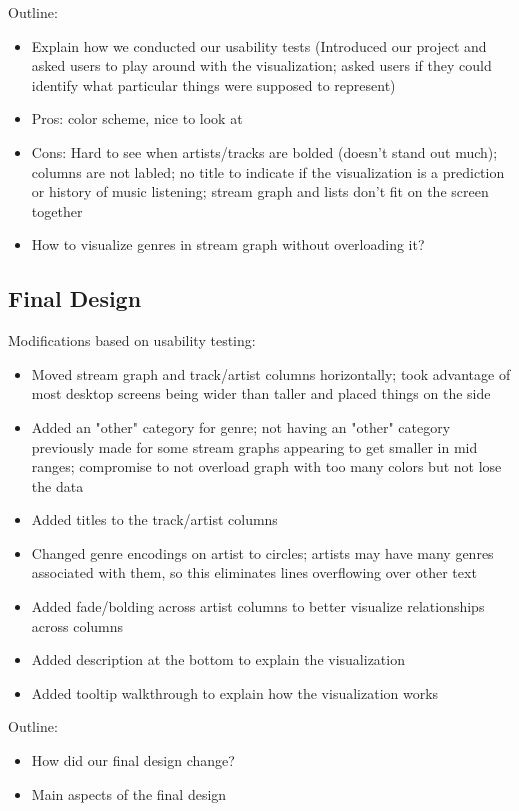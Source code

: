 \documentclass[journal]{vgtc}                %
\begin{document}
Outline:
\begin{itemize}
  \item Explain how we conducted our usability tests (Introduced our project and asked users to play around with the visualization; asked users if they could identify what particular things were supposed to represent)
  \item Pros: color scheme, nice to look at
  \item Cons: Hard to see when artists/tracks are bolded (doesn't stand out much); columns are not labled; no title to indicate if the visualization is a prediction or history of music listening; stream graph and lists don't fit on the screen together
  \item How to visualize genres in stream graph without overloading it?
\end{itemize}



\subsection{Final Design}

Modifications based on usability testing:
\begin{itemize}
  \item Moved stream graph and track/artist columns horizontally; took advantage of most desktop screens being wider than taller and placed things on the side
  \item Added an "other" category for genre; not having an "other" category previously made for some stream graphs appearing to get smaller in mid ranges; compromise to not overload graph with too many colors but not lose the data
  \item Added titles to the track/artist columns
  \item Changed genre encodings on artist to circles; artists may have many genres associated with them, so this eliminates lines overflowing over other text
  \item Added fade/bolding across artist columns to better visualize relationships across columns
  \item Added description at the bottom to explain the visualization
  \item Added tooltip walkthrough to explain how the visualization works
\end{itemize}

Outline:
\begin{itemize}
  \item How did our final design change?
  \item Main aspects of the final design
\end{itemize}
\end{document}
